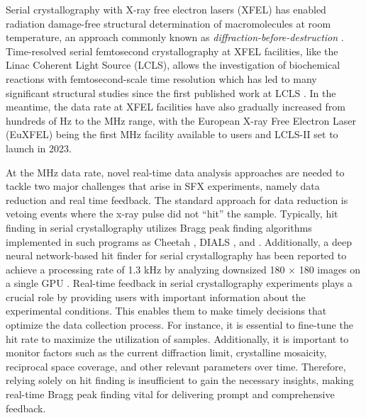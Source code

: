\documentclass[a4paper]{article}
\begin{document}
Serial crystallography with X-ray free electron lasers (XFEL) has enabled radiation damage-free structural determination of macromolecules at room temperature, an approach commonly known as \textit{diffraction-before-destruction} \citep{neutzePotentialBiomolecularImaging2000, chapmanFemtosecondDiffractiveImaging2006,chapmanFemtosecondXrayProtein2011}.  Time-resolved serial femtosecond crystallography at XFEL facilities, like the Linac Coherent Light Source (LCLS), allows the investigation of biochemical reactions with femtosecond-scale time resolution which has led to many significant structural studies \citep{kupitzSerialTimeresolvedCrystallography2014, nangoThreedimensionalMovieStructural2016,pandeFemtosecondStructuralDynamics2016a, youngStructurePhotosystemII2016,sugaLightinducedStructuralChanges2017, kernStructuresIntermediatesKok2018,ibrahimUntanglingSequenceEvents2020, sugaTimeresolvedStudiesMetalloproteins2020} since the first published work at LCLS \citep{aquilaTimeresolvedProteinNanocrystallography2012}.  In the meantime, the data rate at XFEL facilities have also gradually increased from hundreds of Hz to the MHz range, with the European X-ray Free Electron Laser (EuXFEL) being the first MHz facility available to users and LCLS-II set to launch in 2023.  

At the MHz data rate, novel real-time data analysis approaches are needed to tackle two major challenges that arise in SFX experiments, namely data reduction and real time feedback.  The standard approach for data reduction is vetoing events where the x-ray pulse did not ``hit'' the sample. Typically, hit finding in serial crystallography utilizes Bragg peak finding algorithms implemented in such programs as Cheetah  \citep{bartyCheetahSoftwareHighthroughput2014}, DIALS \citep{winterDIALSImplementationEvaluation2018}, and \psocake{} \citep{yoonPsocakeGUIMaking2020}.  Additionally, a deep neural network-based hit finder for serial crystallography has been reported to achieve a processing rate of 1.3 kHz by analyzing downsized 180 $\times$ 180 images on a single GPU \citep{keConvolutionalNeuralNetworkbased2018}.  Real-time feedback in serial crystallography experiments plays a crucial role by providing users with important information about the experimental conditions.  This enables them to make timely decisions that optimize the data collection process. For instance, it is essential to fine-tune the hit rate to maximize the utilization of samples. Additionally, it is important to monitor factors such as the current diffraction limit, crystalline mosaicity, reciprocal space coverage, and other relevant parameters over time. Therefore, relying solely on hit finding is insufficient to gain the necessary insights, making real-time Bragg peak finding vital for delivering prompt and comprehensive feedback.
\end{document}
